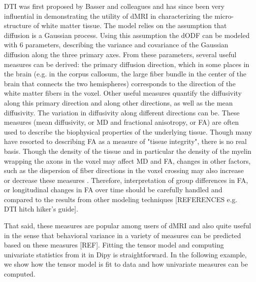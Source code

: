 \documentclass{bioinfo}
\begin{document}
DTI was first proposed by Basser and colleagues \citep{basser-mattiello-etal:94} and has since been very influential in demonstrating the utility of dMRI in characterizing the micro-structure of white matter tissue. The model relies on the assumption that diffusion is a Gaussian process. Using this assumption the dODF can be modeled with 6 parameters, describing the variance and covariance of the Gaussian diffusion along the three primary axes. From these parameters, several useful measures can be derived: the primary diffusion direction, which in some places in the brain (e.g. in the corpus callosum, the large fiber bundle in the center of the brain that connects the two hemispheres) corresponds to the direction of the white matter fibers in the voxel. Other useful measures quantify the diffusivity along this primary direction and along other directions, as well as the mean diffusivity. The variation in diffusivity along different directions can be. These measures (mean diffusivity, or MD and fractional anisotropy, or FA) are often used to describe the biophysical properties of the underlying tissue. Though many have resorted to describing FA as a measure of "tissue integrity", there is no real basis. Though the density of the tissue and in particular the density of the myelin wrapping the axons in the voxel may affect MD and FA, changes in other factors, such as the dispersion of fiber directions in the voxel crossing may also increase or decrease these measures \citep{wandell-yeatman:13}. Therefore, interpretation of group differences in FA, or longitudinal changes in FA over time should be carefully handled and compared to the results from other modeling techniques [REFERENCES e.g. DTI hitch hiker's guide].

That said, these measures are popular among users of dMRI and also quite useful in the sense that behavioral variance in a variety of measures can be predicted based on these measures [REF]. Fitting the tensor model and computing univariate statistics from it in Dipy is straightforward. In the following example, we show how the tensor model is fit to data and how univariate measures can be computed.
\end{document}
